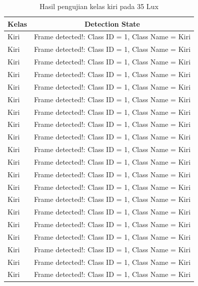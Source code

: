 \begin{longtable}{|l|c|}
  \caption{Hasil pengujian kelas kiri pada 35 Lux}
  \label{tb:luxkiri} \\
  \hline
  \rowcolor[HTML]{C0C0C0} 
  \textbf{Kelas} & \textbf{Detection State}                           \\ \hline
  Kiri           & Frame detected!: Class ID = 1, Class Name = Kiri \\ \hline
  Kiri           & Frame detected!: Class ID = 1, Class Name = Kiri \\ \hline
  Kiri           & Frame detected!: Class ID = 1, Class Name = Kiri \\ \hline
  Kiri           & Frame detected!: Class ID = 1, Class Name = Kiri \\ \hline
  Kiri           & Frame detected!: Class ID = 1, Class Name = Kiri \\ \hline
  Kiri           & Frame detected!: Class ID = 1, Class Name = Kiri \\ \hline
  Kiri           & Frame detected!: Class ID = 1, Class Name = Kiri \\ \hline
  Kiri           & Frame detected!: Class ID = 1, Class Name = Kiri \\ \hline
  Kiri           & Frame detected!: Class ID = 1, Class Name = Kiri \\ \hline
  Kiri           & Frame detected!: Class ID = 1, Class Name = Kiri \\ \hline
  Kiri           & Frame detected!: Class ID = 1, Class Name = Kiri \\ \hline
  Kiri           & Frame detected!: Class ID = 1, Class Name = Kiri \\ \hline
  Kiri           & Frame detected!: Class ID = 1, Class Name = Kiri \\ \hline
  Kiri           & Frame detected!: Class ID = 1, Class Name = Kiri \\ \hline
  Kiri           & Frame detected!: Class ID = 1, Class Name = Kiri \\ \hline
  Kiri           & Frame detected!: Class ID = 1, Class Name = Kiri \\ \hline
  Kiri           & Frame detected!: Class ID = 1, Class Name = Kiri \\ \hline
  Kiri           & Frame detected!: Class ID = 1, Class Name = Kiri \\ \hline
  Kiri           & Frame detected!: Class ID = 1, Class Name = Kiri \\ \hline
  Kiri           & Frame detected!: Class ID = 1, Class Name = Kiri \\ \hline

\end{longtable}
